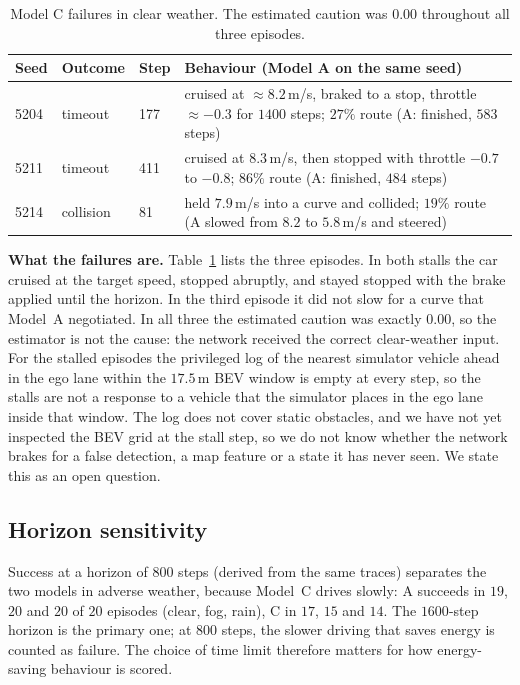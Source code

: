 \documentclass[conference]{IEEEtran}
\begin{document}
\begin{table}[t]
\centering\caption{Model C failures in clear weather. The estimated caution was $0.00$ throughout all three episodes.}\label{tab:fail}
\footnotesize
\begin{tabular}{lllp{3.6cm}}
\toprule
Seed & Outcome & Step & Behaviour (Model A on the same seed)\\
\midrule
5204 & timeout & 177 & cruised at $\approx8.2$\,m/s, braked to a stop, throttle $\approx-0.3$ for $1400$ steps; $27\%$ route (A: finished, $583$ steps)\\
5211 & timeout & 411 & cruised at $8.3$\,m/s, then stopped with throttle $-0.7$ to $-0.8$; $86\%$ route (A: finished, $484$ steps)\\
5214 & collision & 81 & held $7.9$\,m/s into a curve and collided; $19\%$ route (A slowed from $8.2$ to $5.8$\,m/s and steered)\\
\bottomrule
\end{tabular}
\end{table}

\textbf{What the failures are.} Table~\ref{tab:fail} lists the three episodes. In both stalls the car cruised at the target speed, stopped abruptly, and stayed stopped with the brake applied until the horizon. In the third episode it did not slow for a curve that Model~A negotiated. In all three the estimated caution was exactly $0.00$, so the estimator is not the cause: the network received the correct clear-weather input. For the stalled episodes the privileged log of the nearest simulator vehicle ahead in the ego lane within the $17.5$\,m BEV window is empty at every step, so the stalls are not a response to a vehicle that the simulator places in the ego lane inside that window. The log does not cover static obstacles, and we have not yet inspected the BEV grid at the stall step, so we do not know whether the network brakes for a false detection, a map feature or a state it has never seen. We state this as an open question.

\subsection{Horizon sensitivity}
Success at a horizon of $800$ steps (derived from the same traces) separates the two models in adverse weather, because Model~C drives slowly: A succeeds in $19$, $20$ and $20$ of $20$ episodes (clear, fog, rain), C in $17$, $15$ and $14$. The $1600$-step horizon is the primary one; at $800$ steps, the slower driving that saves energy is counted as failure. The choice of time limit therefore matters for how energy-saving behaviour is scored.
\end{document}
